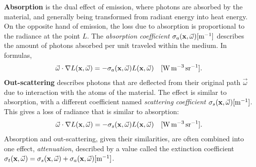 \textbf{Absorption} is the dual effect of emission, where photons are absorbed by the material, and generally being transformed from radiant energy into heat energy. On the opposite hand of emission, the loss due to absorption is proportional to the radiance at the point $L$. The \emph{absorption coefficient} $\sigma_a(\mathbf{x}, \vec{\omega})  [\SI{}{\per \metre}] $ describes the amount of photons absorbed per unit traveled within the medium. In formulas,
\begin{equation*}
\vec{\omega} \cdot \nabla L(\mathbf{x}, \vec{\omega}) = - \sigma_a(\mathbf{x}, \vec{\omega}) L(\mathbf{x}, \vec{\omega}) \siunit{\watt \per \cubic \metre \per \steradian}.
 \end{equation*}
\textbf{Out-scattering} describes photons that are deflected from their original path $\vec{\omega}$  due to interaction with the atoms of the material. The effect is similar to absorption, with a different coefficient named \emph{scattering coefficient} $\sigma_s(\mathbf{x}, \vec{\omega}) [\SI{}{\per \metre}]$. This gives a loss of radiance that is similar to absorption:
\begin{equation*}
\vec{\omega} \cdot \nabla L(\mathbf{x}, \vec{\omega}) = - \sigma_s(\mathbf{x}, \vec{\omega}) L(\mathbf{x}, \vec{\omega})
 \siunit{\watt \per \cubic \metre \per \steradian}.
\end{equation*}
Absorption and out-scattering, given their similarities, are often combined into one effect, \emph{attenuation}, described by a value called the extinction coefficient $\sigma_t(\mathbf{x}, \vec{\omega}) =\sigma_s(\mathbf{x}, \vec{\omega}) + \sigma_a(\mathbf{x}, \vec{\omega}) [\SI{}{\per \metre}]$.

